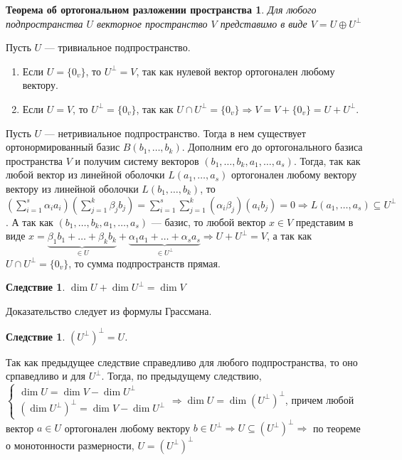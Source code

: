 \newtheorem*{th14_4_2}{Теорема об ортогональном разложении пространства}\begin{th14_4_2}
	Для любого подпространства $U$ векторное пространство $V$ представимо в виде $V= U \oplus U^{\perp}$
\end{th14_4_2}\begin{Proof} Пусть $U$ --- тривиальное подпространство.\begin{enumerate}
		\item Если $U = \{0_v\}$, то $U^\perp = V$, так как нулевой вектор ортогонален любому вектору.
		\item Если $U = V$, то $U^\perp = \{0_v\}$, так как $U\cap U^\perp = \{0_v\}\Rightarrow V = V + \{0_v\} = U + U^{\perp}$.
	\end{enumerate}
	Пусть $U$ --- нетривиальное подпространство. Тогда в нем существует ортонормированный базис  $B(b_1,\dots,b_k)$. Дополним его до ортогонального базиса пространства $V$ и получим систему векторов $(b_1,\dots,b_k, a_1,\dots,a_s)$. Тогда, так как любой вектор из линейной оболочки $L(a_1,\dots,a_s)$ ортогонален любому вектору вектору из линейной оболочки $L(b_1,\dots,b_k)$, то $(\sum\limits_{i=1}^s\alpha_ia_i)(\sum\limits_{j=1}^k\beta_jb_j) = \sum\limits_{i=1}^s\sum\limits_{j=1}^k(\alpha_i\beta_j)(a_ib_j) = 0\Rightarrow L(a_1,\dots,a_s)\subseteq U^\perp$. А так как $(b_1,\dots,b_k,a_1,\dots,a_s)$ --- базис, то любой вектор $x \in V$ представим в виде $x = \underbrace{\beta_1b_1 + \ldots + \beta_k b_k}_{\in U} +\underbrace{ \alpha_1 a_1 + \ldots + \alpha_s a_s}_{\in U^\perp} \Rightarrow U + U^\perp = V$, а так как $U\cap U^\perp = \{0_v\}$, то сумма подпространств прямая.
\end{Proof}
\newtheorem*{cor14_4_1}{Следствие}\begin{cor14_4_1}$\dim  U+\dim  U^{\perp}= \dim  V$
\end{cor14_4_1}
\begin{Proof}
	Доказательство следует из формулы Грассмана.
\end{Proof}
\newtheorem*{cor14_4_2}{Следствие}\begin{cor14_4_2}$(U^{\perp})^{\perp}=U$.
\end{cor14_4_2}\begin{Proof} Так как предыдущее следствие справедливо для любого подпространства, то оно српаведливо и для $U^\perp$. Тогда, по предыдущему следствию,
	$\begin{cases}
		\dim  U = \dim  V - \dim  U^\perp\\
		(\dim  U^\perp)^\perp = \dim V - \dim  U^\perp
	\end{cases}\Rightarrow \dim  U = \dim  (U^\perp)^\perp$, причем любой вектор $a \in U$ ортогонален любому вектору $b \in U^\perp\Rightarrow U\subseteq (U^\perp)^\perp\Rightarrow$ по теореме о монотонности размерности, $U = (U^\perp)^\perp$
\end{Proof}\\\\

